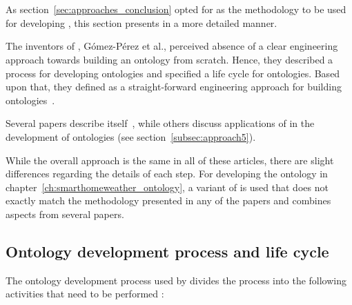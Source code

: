 \section{\methontology}

As section~\ref{sec:approaches_conclusion} opted for \methontology as the methodology to be used for developing \smarthomeweather, this section presents \methontology in a more detailed manner.

\vspace{1em}

The inventors of \methontology, Gómez-Pérez et al., perceived absence of a clear engineering approach towards building an ontology from scratch. Hence, they described a process for developing ontologies and specified a life cycle for ontologies. Based upon that, they defined \methontology as a straight-forward engineering approach for building ontologies~\cite{Methontology}.

Several papers describe \methontology itself~\cite{Methontology,Methontology2,ORSD}, while others discuss applications of \methontology in the development of ontologies (see section~\ref{subsec:approach5}).

While the overall approach is the same in all of these articles, there are slight differences regarding the details of each step. For developing the \smarthomeweather ontology in chapter~\ref{ch:smarthomeweather_ontology}, a variant of \methontology is used that does not exactly match the methodology presented in any of the papers and combines aspects from several papers.

\subsection{Ontology development process and life cycle}

The ontology development process used by \methontology divides the process into the following activities that need to be performed \cite{Methontology}:

